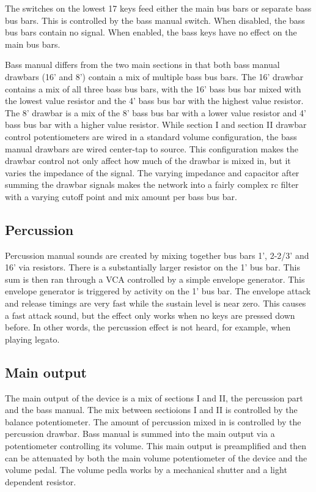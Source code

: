\documentclass[11pt,a4paper]{article}
\begin{document}
The switches on the lowest 17 keys feed either the main bus bars or separate bass bus bars. This is controlled by the bass manual switch. When disabled, the bass bus bars contain no signal. When enabled, the bass keys have no effect on the main bus bars.

Bass manual differs from the two main sections in that both bass manual drawbars (16' and 8') contain a mix of multiple bass bus bars. The 16' drawbar contains a mix of all three bass bus bars, with the 16' bass bus bar mixed with the lowest value resistor and the 4' bass bus bar with the highest value resistor. The 8' drawbar is a mix of the 8' bass bus bar with a lower value resistor and 4' bass bus bar with a higher value resistor. While section I and section II drawbar control potentiometers are wired in a standard volume configuration, the bass manual drawbars are wired center-tap to source. This configuration makes the drawbar control not only affect how much of the drawbar is mixed in, but it varies the impedance of the signal. The varying impedance and capacitor after summing the drawbar signals makes the network into a fairly complex rc filter with a varying cutoff point and mix amount per bass bus bar.

\subsection{Percussion}

Percussion manual sounds are created by mixing together bus bars 1', 2-2/3' and 16' via resistors. There is a substantially larger resistor on the 1' bus bar. This sum is then ran through a VCA controlled by a simple envelope generator. This envelope generator is triggered by activity on the 1' bus bar. The envelope attack and release timings are very fast while the sustain level is near zero. This causes a fast attack sound, but the effect only works when no keys are pressed down before. In other words, the percussion effect is not heard, for example, when playing legato.


\subsection{Main output}

The main output of the device is a mix of sections I and II, the percussion part and the bass manual. The mix between sectioions I and II is controlled by the balance potentiometer. The amount of percussion mixed in is controlled by the percussion drawbar. Bass manual is summed into the main output via a potentiometer controlling its volume. This main output is preamplified and then can be attenuated by both the main volume potentiometer of the device and the volume pedal. The volume pedla works by a mechanical shutter and a light dependent resistor.
\end{document}
